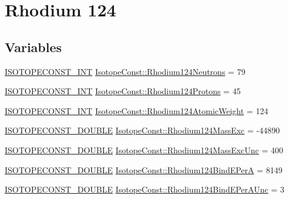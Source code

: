 \hypertarget{group___isotope_const-_rhodium-_rh124}{}\section{Rhodium 124}
\label{group___isotope_const-_rhodium-_rh124}
\subsection*{Variables}
\begin{DoxyCompactItemize}
\item 
\mbox{\hyperlink{group___isotope_const-_macros_ga5f18360b3e99483a35c32d789e62621c}{I\+S\+O\+T\+O\+P\+E\+C\+O\+N\+S\+T\+\_\+\+I\+NT}} \mbox{\hyperlink{group___isotope_const-_rhodium-_rh124_ga0125c30f72e4a168e204af81c469f239}{Isotope\+Const\+::\+Rhodium124\+Neutrons}} = 79
\item 
\mbox{\hyperlink{group___isotope_const-_macros_ga5f18360b3e99483a35c32d789e62621c}{I\+S\+O\+T\+O\+P\+E\+C\+O\+N\+S\+T\+\_\+\+I\+NT}} \mbox{\hyperlink{group___isotope_const-_rhodium-_rh124_gad2882d2e83069a9f4a50861883943890}{Isotope\+Const\+::\+Rhodium124\+Protons}} = 45
\item 
\mbox{\hyperlink{group___isotope_const-_macros_ga5f18360b3e99483a35c32d789e62621c}{I\+S\+O\+T\+O\+P\+E\+C\+O\+N\+S\+T\+\_\+\+I\+NT}} \mbox{\hyperlink{group___isotope_const-_rhodium-_rh124_ga86945674d8e38ea071ba3cedda0400be}{Isotope\+Const\+::\+Rhodium124\+Atomic\+Weight}} = 124
\item 
\mbox{\hyperlink{group___isotope_const-_macros_ga8f45a7272ce02c0b4c65c44636ed719a}{I\+S\+O\+T\+O\+P\+E\+C\+O\+N\+S\+T\+\_\+\+D\+O\+U\+B\+LE}} \mbox{\hyperlink{group___isotope_const-_rhodium-_rh124_ga71862b5be9e9abc39c37077f78baf8e5}{Isotope\+Const\+::\+Rhodium124\+Mass\+Exc}} = -\/44890
\item 
\mbox{\hyperlink{group___isotope_const-_macros_ga8f45a7272ce02c0b4c65c44636ed719a}{I\+S\+O\+T\+O\+P\+E\+C\+O\+N\+S\+T\+\_\+\+D\+O\+U\+B\+LE}} \mbox{\hyperlink{group___isotope_const-_rhodium-_rh124_ga7a8fd23251a1b2b96271783649d4c378}{Isotope\+Const\+::\+Rhodium124\+Mass\+Exc\+Unc}} = 400
\item 
\mbox{\hyperlink{group___isotope_const-_macros_ga8f45a7272ce02c0b4c65c44636ed719a}{I\+S\+O\+T\+O\+P\+E\+C\+O\+N\+S\+T\+\_\+\+D\+O\+U\+B\+LE}} \mbox{\hyperlink{group___isotope_const-_rhodium-_rh124_ga3ca112d1789b73c18c04ba62ebfa8393}{Isotope\+Const\+::\+Rhodium124\+Bind\+E\+PerA}} = 8149
\item 
\mbox{\hyperlink{group___isotope_const-_macros_ga8f45a7272ce02c0b4c65c44636ed719a}{I\+S\+O\+T\+O\+P\+E\+C\+O\+N\+S\+T\+\_\+\+D\+O\+U\+B\+LE}} \mbox{\hyperlink{group___isotope_const-_rhodium-_rh124_ga951268d6a31ff05cd052cc0c49993c7b}{Isotope\+Const\+::\+Rhodium124\+Bind\+E\+Per\+A\+Unc}} = 3

\end{DoxyCompactItemize}
